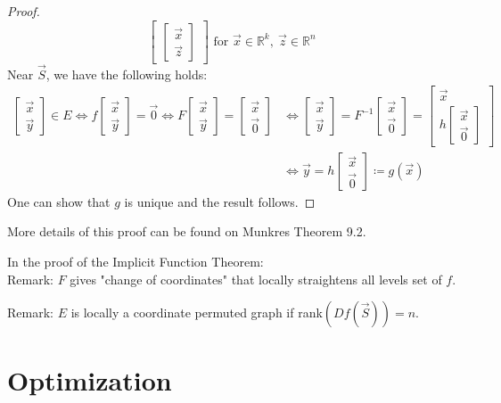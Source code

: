 \documentclass[15pt]{book}
\theoremstyle{break}
\theoremstyle{break}
\newcommand{\R}{\mathbb{R}}
\newcommand{\remark}{\color{blue}Remark: \color{black}}
\begin{document}
\begin{proof}
$$\begin{bmatrix}
\begin{bmatrix}
\vec{x} \\ \vec{z}
\end{bmatrix}
\end{bmatrix} \text{\ \ \  for }\vec{x}\in \R^k,\ \vec{z}\in \R^n$$
Near $\vec{S}$, we have the following holds:
\begin{align*}
\begin{bmatrix}
\vec{x}\\\vec{y}
\end{bmatrix}\in E \iff f\begin{bmatrix}
\vec{x}\\\vec{y}
\end{bmatrix} = \vec{0} \iff F\begin{bmatrix}
\vec{x}\\ \vec{y}
\end{bmatrix}  =\begin{bmatrix}
\vec{x} \\ \vec{0}
\end{bmatrix} &\iff \begin{bmatrix}
\vec{x}\\\vec{y}
\end{bmatrix} = F^{-1}\begin{bmatrix}
\vec{x}\\ \vec{0}
\end{bmatrix}=\begin{bmatrix}
\vec{x} \\ h\begin{bmatrix}
\vec{x} \\ \vec{0}
\end{bmatrix}
\end{bmatrix}  \\&\iff \vec{y} = h\begin{bmatrix}
\vec{x}\\\vec{0}
\end{bmatrix}\coloneqq g(\vec{x})
\end{align*}
One can show that $g$ is unique and the result follows. 
\end{proof}
More details of this proof can be found on Munkres Theorem 9.2.
\hfill\break

In the proof of the Implicit Function Theorem:\\
\remark $F$ gives "change of coordinates" that locally straightens all levels set of $f$. 

\remark $E$ is locally a coordinate permuted graph if rank$(Df(\vec{S}))= n$.


\newpage
\section[Optimization]{\color{red} Optimization \color{black}}
\end{document}

